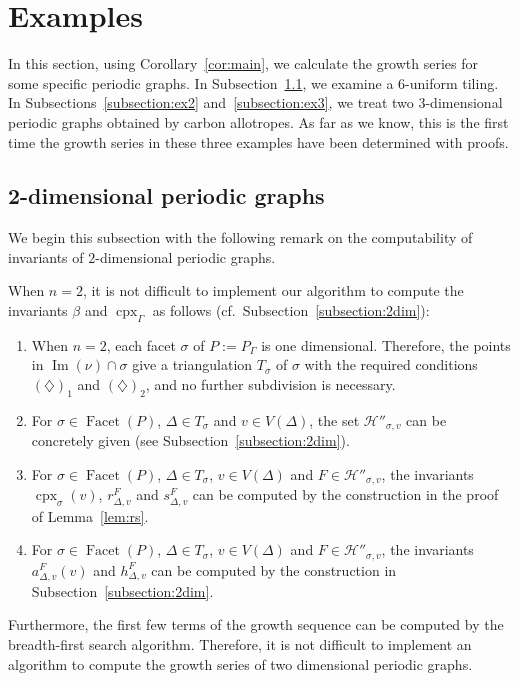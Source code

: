 \section{Examples} \label{section:ex}

In this section, using Corollary~\ref{cor:main}, we calculate the growth series for some specific periodic graphs. 
In Subsection~\ref{subsection:tilings}, we examine a $6$-uniform tiling. 
In Subsections~\ref{subsection:ex2} and~\ref{subsection:ex3}, we treat two $3$-dimensional periodic graphs obtained by carbon allotropes. 
As far as we know, this is the first time the growth series in these three examples have been determined with proofs.



\subsection{2-dimensional periodic graphs}\label{subsection:tilings}

We begin this subsection with the following remark on the computability of invariants of  $2$-dimensional periodic graphs.
\begin{rmk}\label{rmk:implement}
When $n=2$, it is not difficult to implement our algorithm to compute the invariants $\beta$ and $\operatorname{cpx}_{\Gamma}$ as follows (cf.\ Subsection~\ref{subsection:2dim}): 

\begin{enumerate}
\item 
When $n=2$, each facet $\sigma$ of $P := P_{\Gamma}$ is one dimensional. 
Therefore, the points in $\operatorname{Im}(\nu) \cap \sigma$ give a triangulation $T_{\sigma}$ of $\sigma$ with the required conditions $(\diamondsuit)_1$ and $(\diamondsuit)_2$, and no further subdivision is necessary.

\item
For $\sigma \in \operatorname{Facet}(P)$, $\Delta \in T_{\sigma}$ and $v \in V(\Delta)$, 
the set $\mathcal{H}'' _{\sigma, v}$ can be concretely given (see  Subsection~\ref{subsection:2dim}). 

\item 
For $\sigma \in \operatorname{Facet}(P)$, $\Delta \in T_{\sigma}$, $v \in V(\Delta)$ and $F \in \mathcal{H}'' _{\sigma, v}$, 
the invariants $\operatorname{cpx}_{\sigma} (v)$, $r^F _{\Delta, v}$ and $s^F _{\Delta, v}$ can be computed by the construction in the proof of Lemma~\ref{lem:rs}. 

\item
For $\sigma \in \operatorname{Facet}(P)$, $\Delta \in T_{\sigma}$, $v \in V(\Delta)$ and $F \in \mathcal{H}'' _{\sigma, v}$, 
the invariants $a^F _{\Delta, v}(v)$ and $h^F _{\Delta, v}$ can be computed by the construction in Subsection~\ref{subsection:2dim}. 
\end{enumerate}
Furthermore, the first few terms of the growth sequence can be computed by the breadth-first search algorithm. 
Therefore, it is not difficult to implement an algorithm to compute the growth series of two dimensional periodic graphs. 
\end{rmk}

